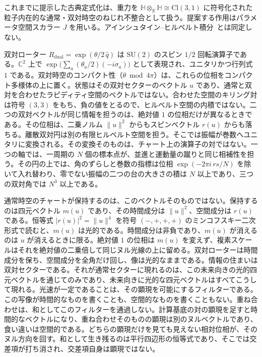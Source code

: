 \documentclass[a4paper]{article}
\begin{document}
これまでに提示した古典定式化は、重力を $\mathbb{H}\otimes_{\mathbb{R}}\mathbb{H}\cong\mathrm{Cl}(3,1)$ に符号化された粒子内在的な通常・双対時空のねじれ不整合として扱う。提案する作用はパラメータ空間スカラー $J$ を用いる。アインシュタイン--ヒルベルト積分~\cite{hilbert1915}とは同定しない。

双対ローター $R_\text{dual}=\exp(\theta/2\,\hat q)$ は $\mathrm{SU}(2)$ のスピン $1/2$ 回転演算子である。$\mathbb{C}^2$ 上で $\exp\bigl(\sum_a(\theta_a/2)\allowbreak(-i\sigma_a)\bigr)$ として表現され、ユニタリかつ行列式 $1$ である。双対時空のコンパクト性（$\theta\bmod 4\pi$）は、これらの位相をコンパクト多様体の上に置く。状態はその双対セクターのベクトル $u$ であり、通常と双対を合わせたラピディティ空間のベクトルではない。合わせた空間のキリング対は符号 $(3,3)$ をもち、負の値をとるので、ヒルベルト空間の内積ではない。二つの双対ベクトルが同じ情報を担うのは、絶対値 $1$ の位相だけが異なるときである。その位相は、二乗ノルム $\lVert u\rVert^2$ からもスピンベクトル $r(u)$ からも落ちる。離散双対円は別の有限ヒルベルト空間を担う。そこでは振幅が巻数へユニタリに変換される。その変換そのものは、チャート上の演算子の対ではない。一つの軸では、一周期の \(N\) 個の標本点が、並進と運動量の蹴りと同じ相補性を担う。その円の上では、角のずらしと巻数の指標は位相 \(\exp(-2\pi i\, rs/N)\) を除いて入れ替わり、零でない振幅の二つの台の大きさの積は \(N\) 以上であり、三つの双対角では \(N^3\) 以上である。

通常時空のチャートが保持するのは、このベクトルそのものではない。保持するのは四元ベクトル $m(u)$ であり、その時間成分は $\lVert u\rVert^2$、空間成分は $r(u)$ である。恒等式 $|r(u)|^2=\lVert u\rVert^4$ を符号 $(-,+,+,+)$ のミンコフスキー二次形式で読むと、$m(u)$ は光的である。時間成分は非負であり、$m(u)$ が消えるのは $u$ が消えるときに限る。絶対値 $1$ の位相は $m(u)$ を変えず、複素スケールはそれを絶対値の二乗倍して同じヌル光線の上に留める。双対ローターは時間成分を保ち、空間成分を全角だけ回し、像は光的なままである。情報の住まいは双対セクターである。それが通常セクターに現れるのは、この未来向きの光的四元ベクトルを通じてのみであり、未来向きに光的な四元ベクトルはすべてこうして現れる。光速が一定であることは、その顕現を可能にするフィルターである。この写像が時間的なものを書くことも、空間的なものを書くこともない。重ね合わせは、和としてこのフィルターを通過しない。計算基底の対の顕現を足すと時間的なベクトルになり、重ね合わせそのものの顕現は別のヌルベクトルであり、食い違いは空間的である。どちらの顕現だけを見ても見えない相対位相が、そのヌル方向を回す。和として生き残るのは平行四辺形の恒等式であり、そこでは交差項が打ち消され、交差項自身は顕現ではない。
\end{document}
